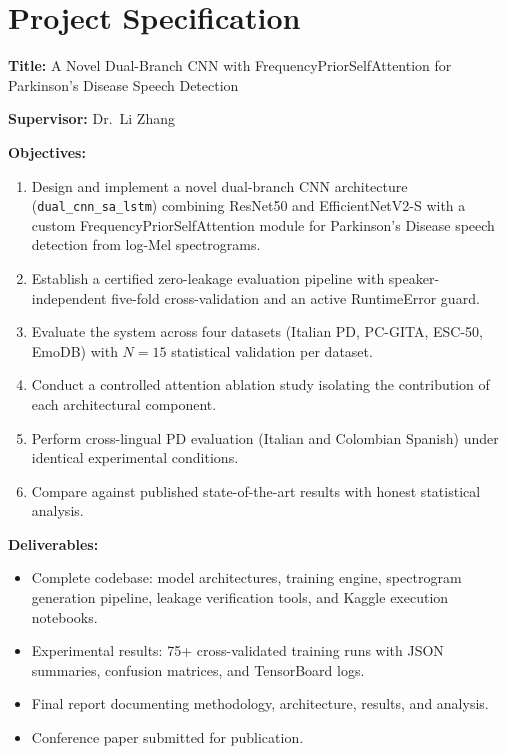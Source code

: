 \documentclass[oneside,openany]{final_report}
\newcommand{\dualcnn}{\texttt{dual\_cnn\_sa\_lstm}}
\begin{document}
\chapter*{Project Specification}

\textbf{Title:} A Novel Dual-Branch CNN with FrequencyPriorSelfAttention for Parkinson's Disease Speech Detection

\textbf{Supervisor:} Dr.\ Li Zhang

\textbf{Objectives:}
\begin{enumerate}
    \item Design and implement a novel dual-branch CNN architecture (\dualcnn{}) combining ResNet50 and EfficientNetV2-S with a custom FrequencyPriorSelfAttention module for Parkinson's Disease speech detection from log-Mel spectrograms.
    \item Establish a certified zero-leakage evaluation pipeline with speaker-independent five-fold cross-validation and an active RuntimeError guard.
    \item Evaluate the system across four datasets (Italian PD, PC-GITA, ESC-50, EmoDB) with $N\!=\!15$ statistical validation per dataset.
    \item Conduct a controlled attention ablation study isolating the contribution of each architectural component.
    \item Perform cross-lingual PD evaluation (Italian and Colombian Spanish) under identical experimental conditions.
    \item Compare against published state-of-the-art results with honest statistical analysis.
\end{enumerate}

\textbf{Deliverables:}
\begin{itemize}
    \item Complete codebase: model architectures, training engine, spectrogram generation pipeline, leakage verification tools, and Kaggle execution notebooks.
    \item Experimental results: 75+ cross-validated training runs with JSON summaries, confusion matrices, and TensorBoard logs.
    \item Final report documenting methodology, architecture, results, and analysis.
    \item Conference paper submitted for publication.
\end{itemize}

\end{document}
